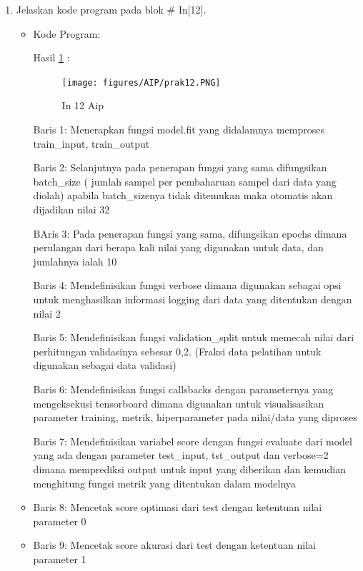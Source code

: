 \begin{enumerate}
\item Jelaskan kode program pada blok \# In[12].
\begin{itemize}
\item Kode Program:

\par Hasil \ref{in12aip} :
\begin{figure}[!hbtp]
\centering
\texttt{[image: figures/AIP/prak12.PNG]}
\caption{In 12 Aip}
\label{in12aip}
\end{figure}
\par Baris 1: Menerapkan fungsi model.fit yang didalamnya memproses train\_input, train\_output
\par Baris 2: Selanjutnya pada penerapan fungsi yang sama difungsikan batch\_size ( jumlah sampel per pembaharuan sampel dari data yang diolah) apabila batch\_sizenya tidak ditemukan maka otomatis akan dijadikan nilai 32	
\par BAris 3: Pada penerapan fungsi yang sama, difungsikan epochs dimana perulangan dari berapa kali nilai yang digunakan untuk data, dan jumlahnya ialah 10
\par Baris 4: Mendefinisikan fungsi verbose dimana digunakan sebagai opsi untuk menghasilkan informasi logging dari data yang ditentukan dengan nilai 2
\par Baris 5: Mendefinisikan fungsi validation\_split untuk memecah nilai dari perhitungan validasinya sebesar 0,2. (Fraksi data pelatihan untuk digunakan sebagai data validasi)
\par Baris 6: Mendefinisikan fungsi callsbacks dengan parameternya yang mengeksekusi tensorboard dimana digunakan untuk visualisasikan parameter training, metrik, hiperparameter pada nilai/data yang diproses
\par Baris 7: Mendefinisikan variabel score dengan fungsi evaluate dari model yang ada dengan parameter test\_input, tst\_output dan verbose=2 dimana memprediksi output untuk input yang diberikan dan kemudian menghitung fungsi metrik yang ditentukan dalam modelnya
\item Baris 8: Mencetak score optimasi dari test dengan ketentuan nilai parameter 0
\item Baris 9: Mencetak score akurasi dari test dengan ketentuan nilai parameter 1
\end{itemize}
\par


\end{enumerate}
